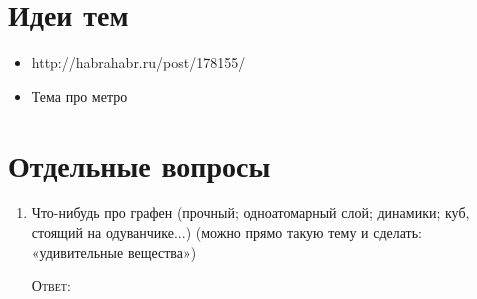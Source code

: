 \documentclass[a4paper,10pt]{article}
\let\keyword\textsc
\newenvironment{topic}{\begin{enumerate}}{\end{enumerate}}
\newcommand{\question}[3]{\item[#1.] #2 \par \keyword{Ответ:} #3}
\begin{document}
\section{Идеи тем}

\begin{itemize}
 \item http://habrahabr.ru/post/178155/
 \item Тема про метро
\end{itemize}


\section{Отдельные вопросы}

\begin{topic}
 \question{??}{Что-нибудь про графен (прочный; одноатомарный слой; динамики; куб, стоящий на одуванчике...) (можно прямо такую тему и сделать: «удивительные вещества»)}
\end{topic}
\end{document}
